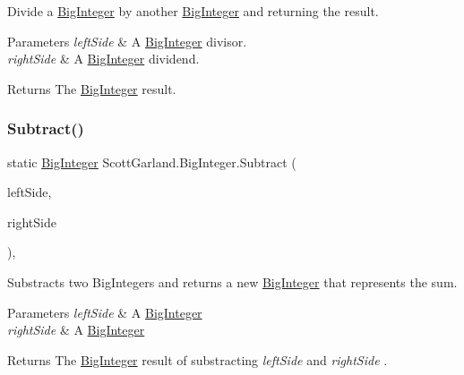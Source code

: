 Divide a \hyperlink{class_scott_garland_1_1_big_integer}{Big\+Integer} by another \hyperlink{class_scott_garland_1_1_big_integer}{Big\+Integer} and returning the result. 


\begin{DoxyParams}{Parameters}
{\em left\+Side} & A \hyperlink{class_scott_garland_1_1_big_integer}{Big\+Integer} divisor.\\
\hline
{\em right\+Side} & A \hyperlink{class_scott_garland_1_1_big_integer}{Big\+Integer} dividend.\\
\hline
\end{DoxyParams}
\begin{DoxyReturn}{Returns}
The \hyperlink{class_scott_garland_1_1_big_integer}{Big\+Integer} result.
\end{DoxyReturn}
\mbox{\label{class_scott_garland_1_1_big_integer_a7e0f9a9d2a70f35407d808b143ac7a0a}} 
\subsubsection{\texorpdfstring{Subtract()}{Subtract()}}
{\footnotesize\ttfamily static \hyperlink{class_scott_garland_1_1_big_integer}{Big\+Integer} Scott\+Garland.\+Big\+Integer.\+Subtract (\begin{DoxyParamCaption}\item[{\hyperlink{class_scott_garland_1_1_big_integer}{Big\+Integer}}]{left\+Side,  }\item[{\hyperlink{class_scott_garland_1_1_big_integer}{Big\+Integer}}]{right\+Side }\end{DoxyParamCaption})\hspace{0.3cm}{\ttfamily [inline]}, {\ttfamily [static]}}



Substracts two Big\+Integers and returns a new \hyperlink{class_scott_garland_1_1_big_integer}{Big\+Integer} that represents the sum. 


\begin{DoxyParams}{Parameters}
{\em left\+Side} & A \hyperlink{class_scott_garland_1_1_big_integer}{Big\+Integer}\\
\hline
{\em right\+Side} & A \hyperlink{class_scott_garland_1_1_big_integer}{Big\+Integer}\\
\hline
\end{DoxyParams}
\begin{DoxyReturn}{Returns}
The \hyperlink{class_scott_garland_1_1_big_integer}{Big\+Integer} result of substracting {\itshape left\+Side}  and {\itshape right\+Side} .
\end{DoxyReturn}
\mbox{\label{class_scott_garland_1_1_big_integer_a743cb38de54da022a77772bcbb0d80ec}} 

